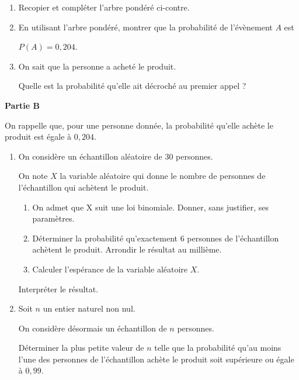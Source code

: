 \begin{enumerate}
	\item Recopier et compléter l'arbre pondéré ci-contre.
	\item En utilisant l'arbre pondéré, montrer que la probabilité de l'évènement $A$ est 
	
	$P(A) = 0,204$.
	\item On sait que la personne a acheté le produit.
	
	Quelle est la probabilité qu'elle ait décroché au premier appel ?
\end{enumerate}

\medskip

\textbf{Partie B}

\medskip

On rappelle que, pour une personne donnée, la probabilité qu'elle achète le produit est égale à $0,204$.

\begin{enumerate}
	\item On considère un échantillon aléatoire de $30$ personnes.
	
	On note $X$ la variable aléatoire qui donne le nombre de personnes de l'échantillon qui achètent le produit.
	\begin{enumerate}
		\item On admet que X suit une loi binomiale. Donner, sans justifier, ses paramètres. 
		\item Déterminer la probabilité qu'exactement 6 personnes de l'échantillon achètent
		le produit. Arrondir le résultat au millième.
		\item Calculer l'espérance de la variable aléatoire $X$.
	\end{enumerate}
	Interpréter le résultat.
	\item Soit $n$ un entier naturel non nul.
	
	On considère désormais un échantillon de $n$ personnes. 
	
	Déterminer la plus petite valeur de $n$ telle que la probabilité qu'au moins l'une des personnes de l'échantillon achète le produit soit supérieure ou égale à $0,99$.
\end{enumerate}
